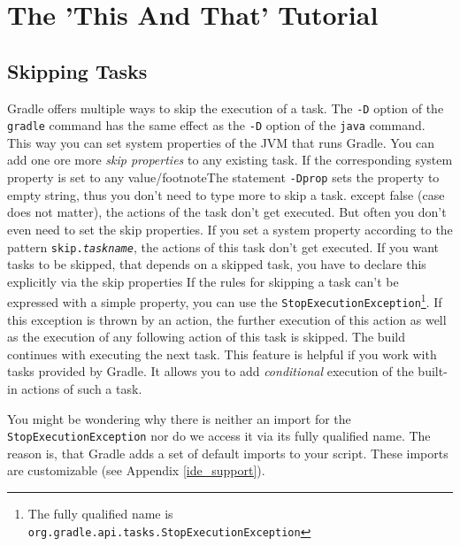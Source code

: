 \chapter{The 'This And That' Tutorial} %
\label{cha:the_this_and_that_tutorial}
\section{Skipping Tasks}
Gradle offers multiple ways to skip the execution of a task.
The \texttt{-D} option of the \texttt{gradle} command has the same effect as the \texttt{-D} option of the \texttt{java} command. This way you can set system properties of the JVM that runs Gradle. You can add one ore more \emph{skip properties} to any existing task. If the corresponding system property is set to any value/footnote{The statement \texttt{-Dprop} sets the property to empty string, thus you don't need to type more to skip a task.} except false (case does not matter), the actions of the task don't get executed. But often you don't even need to set the skip properties. If you set a system property according to the pattern \texttt{skip.\emph{taskname}}, the actions of this task don't get executed.
If you want tasks to be skipped, that depends on a skipped task, you have to declare this explicitly via the skip properties
%
If the rules for skipping a task can't be expressed with a simple property, you can use the \texttt{StopExecutionException}\footnote{The fully qualified name is \texttt{org.gradle.api.tasks.StopExecutionException}}. If this exception is thrown by an action, the further execution of this action as well as the execution of any following action of this task is skipped. The build continues with executing the next task.
%
This feature is helpful if you work with tasks provided by Gradle. It allows you to add \emph{conditional} execution of the built-in actions of such a task. 

You might be wondering why there is neither an import for the \texttt{StopExecutionException} nor do we access it via its fully qualified name. The reason is, that Gradle adds a set of default imports to your script. These imports are customizable (see Appendix \ref{ide_support}).

